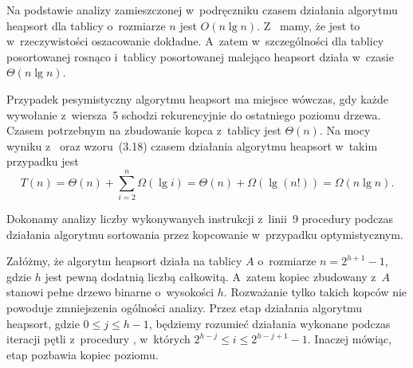 \exercise %
Na podstawie analizy zamieszczonej w~podręczniku czasem działania algorytmu heapsort dla tablicy o~rozmiarze $n$ jest $O(n\lg n)$. Z~ mamy, że jest to w~rzeczywistości oszacowanie dokładne. A~zatem w~szczególności dla tablicy posortowanej rosnąco i~tablicy posortowanej malejąco heapsort działa w~czasie $\Theta(n\lg n)$.

\exercise %
Przypadek pesymistyczny algorytmu heapsort ma miejsce wówczas, gdy każde wywołanie  z~wiersza~5 schodzi rekurencyjnie do ostatniego poziomu drzewa. Czasem potrzebnym na zbudowanie kopca z~tablicy  jest $\Theta(n)$. Na mocy wyniku z~ oraz wzoru~(3.18) czasem działania algorytmu heapsort w~takim przypadku jest
\[
	T(n) = \Theta(n)+\sum_{i=2}^{n}\Omega(\lg i) = \Theta(n)+\Omega(\lg(n!)) = \Omega(n\lg n).
\]

\exercise %
Dokonamy analizy liczby wykonywanych instrukcji z~linii~9 procedury  podczas działania algorytmu sortowania przez kopcowanie w~przypadku optymistycznym.

Załóżmy, że algorytm heapsort działa na tablicy $A$ o~rozmiarze $n=2^{h+1}-1$, gdzie $h$ jest pewną dodatnią liczbą całkowitą. A~zatem kopiec zbudowany z~$A$ stanowi pełne drzewo binarne o~wysokości $h$. Rozważanie tylko takich kopców nie powoduje zmniejszenia ogólności analizy. Przez  etap działania algorytmu heapsort, gdzie $0\le j\le h-1$, będziemy rozumieć działania wykonane podczas iteracji pętli  z~procedury , w~których $2^{h-j}\le i\le2^{h-j+1}-1$. Inaczej mówiąc,  etap pozbawia kopiec  poziomu.

